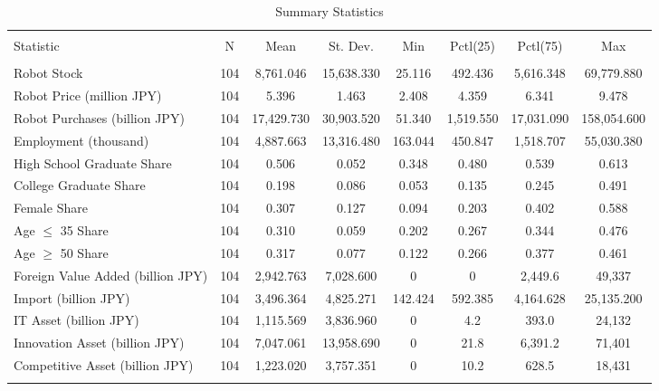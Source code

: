 
\begin{table}[!htbp] \centering 
  \caption{Summary Statistics} 
  \label{summaryStats} 
\begin{tabular}{@{\extracolsep{5pt}}lccccccc} 
\\[-1.8ex]\hline 
\hline \\[-1.8ex] 
Statistic & \multicolumn{1}{c}{N} & \multicolumn{1}{c}{Mean} & \multicolumn{1}{c}{St. Dev.} & \multicolumn{1}{c}{Min} & \multicolumn{1}{c}{Pctl(25)} & \multicolumn{1}{c}{Pctl(75)} & \multicolumn{1}{c}{Max} \\ 
\hline \\[-1.8ex] 
Robot Stock & 104 & 8,761.046 & 15,638.330 & 25.116 & 492.436 & 5,616.348 & 69,779.880 \\ 
Robot Price (million JPY) & 104 & 5.396 & 1.463 & 2.408 & 4.359 & 6.341 & 9.478 \\ 
Robot Purchases (billion JPY) & 104 & 17,429.730 & 30,903.520 & 51.340 & 1,519.550 & 17,031.090 & 158,054.600 \\ 
Employment (thousand) & 104 & 4,887.663 & 13,316.480 & 163.044 & 450.847 & 1,518.707 & 55,030.380 \\ 
High School Graduate Share & 104 & 0.506 & 0.052 & 0.348 & 0.480 & 0.539 & 0.613 \\ 
College Graduate Share & 104 & 0.198 & 0.086 & 0.053 & 0.135 & 0.245 & 0.491 \\ 
Female Share & 104 & 0.307 & 0.127 & 0.094 & 0.203 & 0.402 & 0.588 \\ 
Age $\leq$ 35 Share & 104 & 0.310 & 0.059 & 0.202 & 0.267 & 0.344 & 0.476 \\ 
Age $\geq$ 50 Share & 104 & 0.317 & 0.077 & 0.122 & 0.266 & 0.377 & 0.461 \\ 
Foreign Value Added (billion JPY) & 104 & 2,942.763 & 7,028.600 & 0 & 0 & 2,449.6 & 49,337 \\ 
Import (billion JPY) & 104 & 3,496.364 & 4,825.271 & 142.424 & 592.385 & 4,164.628 & 25,135.200 \\ 
IT Asset (billion JPY) & 104 & 1,115.569 & 3,836.960 & 0 & 4.2 & 393.0 & 24,132 \\ 
Innovation Asset (billion JPY) & 104 & 7,047.061 & 13,958.690 & 0 & 21.8 & 6,391.2 & 71,401 \\ 
Competitive Asset (billion JPY) & 104 & 1,223.020 & 3,757.351 & 0 & 10.2 & 628.5 & 18,431 \\ 
\hline \\[-1.8ex] 
\end{tabular} 
\end{table} 
